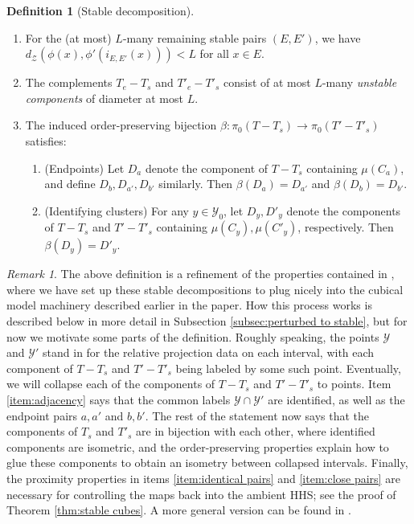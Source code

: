 \documentclass{amsart}
\theoremstyle{definition}
\newtheorem{definition}[theorem]{Definition}
\theoremstyle{remark}
\newtheorem{remark}[theorem]{Remark}
\theoremstyle{definition}
\newcommand{\calY}{\mathcal{Y}}
\newcommand{\calZ}{\mathcal{Z}}
\begin{document}
\begin{definition}[Stable decomposition]
\begin{enumerate}
\begin{enumerate}
\item For the (at most) $L$-many remaining stable pairs $(E,E')$, we have $d_{\calZ}(\phi(x), \phi'(i_{E,E'}(x)))< L$ for all $x \in E$. \label{item:close pairs}
\item The complements $T_{e} - T_s$ and $T'_{e} - T'_s$ consist of at most $L$-many \emph{unstable components} of diameter at most $L$.\label{item:unstable components}
\item The induced order-preserving bijection $\beta:\pi_0(T-T_s) \to \pi_0(T' - T'_s)$ satisfies: \label{item:adjacency}
\begin{enumerate}
\item (Endpoints) Let $D_a$ denote the component of $T-T_s$ containing $\mu(C_a)$, and define $D_b,D_{a'},D_{b'}$ similarly.  Then $\beta(D_a) = D_{a'}$ and $\beta(D_b) = D_{b'}$. \label{item:endpoint condition}
\item (Identifying clusters) For any $y \in \calY_0$, let $D_y, D'_y$ denote the components of $T-T_s$ and $T' - T'_s$ containing $\mu(C_y), \mu(C'_y)$, respectively.  Then $\beta(D_y) = D'_y$. \label{item:cluster identify}
\end{enumerate}
\end{enumerate}
\end{enumerate}
\end{definition}

\begin{remark}
The above definition is a refinement of the properties contained in \cite[Stable Tree Theorem 3.2]{DMS_bary}, where we have set up these stable decompositions to plug nicely into the cubical model machinery described earlier in the paper. How this process works is described below in more detail in Subsection \ref{subsec:perturbed to stable}, but for now we motivate some parts of the definition.  Roughly speaking, the points $\calY$ and $\calY'$ stand in for the relative projection data on each interval, with each component of $T - T_s$ and $T' - T'_s$ being labeled by some such point.  Eventually, we will collapse each of the components of $T - T_s$ and $T' - T'_s$ to points.  Item \eqref{item:adjacency} says that the common labels $\calY \cap \calY'$ are identified, as well as the endpoint pairs $a,a'$ and $b,b'$.  The rest of the statement now says that the components of $T_s$ and $T'_s$ are in bijection with each other, where identified components are isometric, and the order-preserving properties explain how to glue these components to obtain an isometry between collapsed intervals.  Finally, the proximity properties in items \eqref{item:identical pairs} and \eqref{item:close pairs} are necessary for controlling the maps back into the ambient HHS; see the proof of Theorem \ref{thm:stable cubes}.  A more general version can be found in \cite[Definition 10.18]{DMS_FJ}. 
\end{remark}
\end{document}
